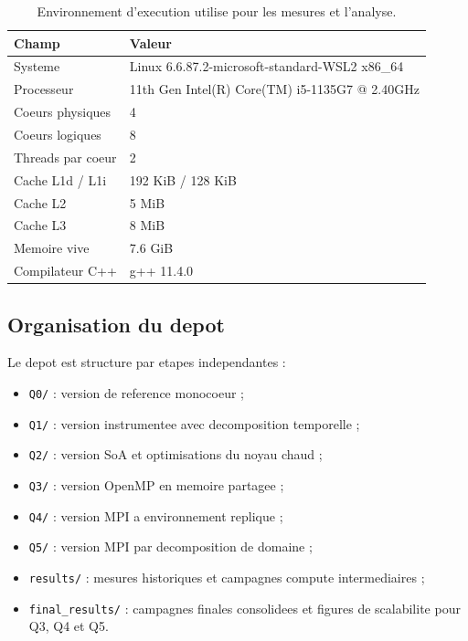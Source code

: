 \documentclass[11pt,a4paper]{article}
\begin{document}
\begin{table}[H]
  \centering
  \small
  \caption{Environnement d'execution utilise pour les mesures et l'analyse.}
  \label{tab:machine}
  \begin{tabular}{@{}ll@{}}
    \toprule
    Champ & Valeur \\
    \midrule
    Systeme & Linux 6.6.87.2-microsoft-standard-WSL2 x86\_64 \\
    Processeur & 11th Gen Intel(R) Core(TM) i5-1135G7 @ 2.40GHz \\
    Coeurs physiques & 4 \\
    Coeurs logiques & 8 \\
    Threads par coeur & 2 \\
    Cache L1d / L1i & 192 KiB / 128 KiB \\
    Cache L2 & 5 MiB \\
    Cache L3 & 8 MiB \\
    Memoire vive & 7.6 GiB \\
    Compilateur C++ & g++ 11.4.0 \\
    \bottomrule
  \end{tabular}
\end{table}

\subsection{Organisation du depot}

Le depot est structure par etapes independantes :

\begin{itemize}[leftmargin=1.2em]
  \item \texttt{Q0/} : version de reference monocoeur ;
  \item \texttt{Q1/} : version instrumentee avec decomposition temporelle ;
  \item \texttt{Q2/} : version SoA et optimisations du noyau chaud ;
  \item \texttt{Q3/} : version OpenMP en memoire partagee ;
  \item \texttt{Q4/} : version MPI a environnement replique ;
  \item \texttt{Q5/} : version MPI par decomposition de domaine ;
  \item \texttt{results/} : mesures historiques et campagnes compute intermediaires ;
  \item \texttt{final\_results/} : campagnes finales consolidees et figures de scalabilite pour Q3, Q4 et Q5.
\end{itemize}
\end{document}
